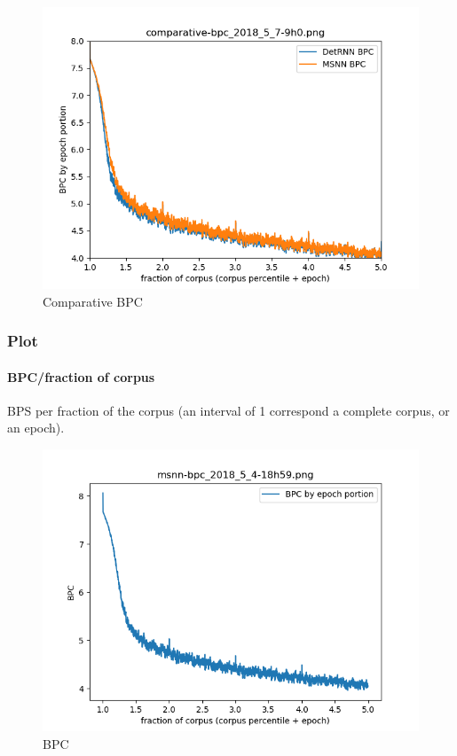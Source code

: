 \begin{figure}[h]
\centering
\includegraphics{parts/appendix/reports-gmsnn/docs_esteban-latex/test_reports/comparative-bpc-det-msnn_2018_5_7-9h0.png}
\caption{Comparative BPC}
\end{figure}

\subsubsection{Plot}

\paragraph{BPC/fraction of corpus}

BPS per fraction of the corpus (an interval of 1 correspond a complete
corpus, or an epoch).

\begin{figure}[h]
\centering
\includegraphics{parts/appendix/reports-gmsnn/docs_esteban-latex/test_reports/msnn-base/msnn-bpc_2018_5_4-18h59.png}
\caption{BPC}
\end{figure}

